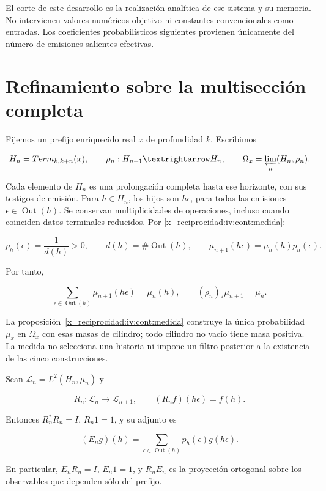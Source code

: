 El corte de este desarrollo es la realización analítica de ese sistema y su memoria. No intervienen valores numéricos objetivo ni constantes convencionales como entradas. Los coeficientes probabilísticos siguientes provienen únicamente del número de emisiones salientes efectivas.

\section{Refinamiento sobre la multisección completa}

Fijemos un prefijo enriquecido real \(x\) de profundidad \(k\). Escribimos

\[
H_n=\operatorname{Term}_{k,k+n}(x),\qquad
\rho_n:H_{n+1}\longrightarrow H_n,
\qquad \Omega_x=\varprojlim_n(H_n,\rho_n).
\]

Cada elemento de \(H_n\) es una prolongación completa hasta ese horizonte, con sus testigos de emisión. Para \(h\in H_n\), los hijos son \(h\epsilon\), para todas las emisiones \(\epsilon\in\operatorname{Out}(h)\). Se conservan multiplicidades de operaciones, incluso cuando coinciden datos terminales reducidos. Por \cref{x_reciprocidad:iv:cont:medida}:

\[
p_h(\epsilon)=\frac1{d(h)}>0,\qquad
d(h)=\#\operatorname{Out}(h),\qquad
\mu_{n+1}(h\epsilon)=\mu_n(h)p_h(\epsilon).
\]

Por tanto,

\begin{equation}
\sum_{\epsilon\in\operatorname{Out}(h)}\mu_{n+1}(h\epsilon)=\mu_n(h),
\qquad (\rho_n)_*\mu_{n+1}=\mu_n.
\label{x_reciprocidad:nuc01:eq:1}
\end{equation}

La proposición~\ref{x_reciprocidad:iv:cont:medida} construye la única probabilidad \(\mu_x\) en \(\Omega_x\) con esas masas de cilindro; todo cilindro no vacío tiene masa positiva. La medida no selecciona una historia ni impone un filtro posterior a la existencia de las cinco construcciones.

\begin{proposition}
\label{x_reciprocidad:nuc01:pullback}

Sean \(\mathscr L_n=L^2(H_n,\mu_n)\) y

\[
R_n:\mathscr L_n\longrightarrow\mathscr L_{n+1},\qquad
(R_nf)(h\epsilon)=f(h).
\]

Entonces \(R_n^*R_n=I\), \(R_n1=1\), y su adjunto es

\begin{equation}
(E_ng)(h)=\sum_{\epsilon\in\operatorname{Out}(h)}p_h(\epsilon)g(h\epsilon).
\label{x_reciprocidad:nuc01:eq:2}
\end{equation}

En particular, \(E_nR_n=I\), \(E_n1=1\), y \(R_nE_n\) es la proyección ortogonal sobre los observables que dependen sólo del prefijo.
\end{proposition}

